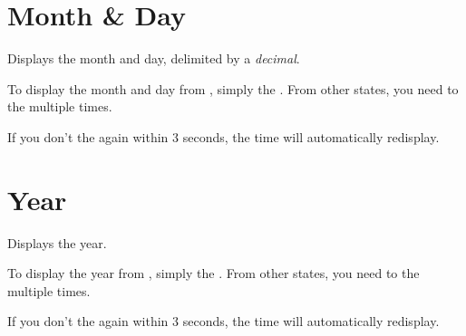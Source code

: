 \section{Month \& Day} 

Displays the month and day, delimited by a \textit{decimal}.


To display the month and day from , simply  the .  From
other states, you need to  the  multiple times.


If you don't  the  again within \num{3} seconds, the time will
automatically redisplay.


\section{Year} 

Displays the year.


To display the year from , simply  the . From other
states, you need to  the  multiple times.


If you don't  the  again within \num{3} seconds, the time will
automatically redisplay.


